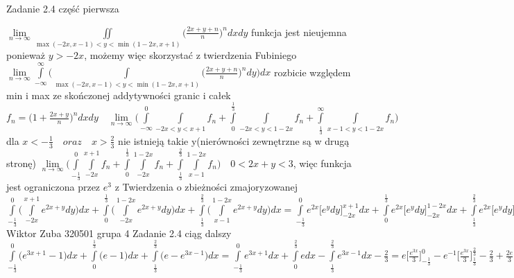 \documentclass{article}
\begin{document}
Zadanie 2.4 część pierwsza
\newline




$
\lim\limits_{n \to \infty}\iint\limits_{\max{(-2x,x-1)}<y<\min{(1-2x,x+1)}}\bigl(\frac{2x+y+n}{n}\bigr)^n dxdy
$
funkcja jest nieujemna ponieważ $y>-2x$, możemy więc skorzystać z twierdzenia Fubiniego
\newline
$
\lim\limits_{n \to \infty}\int\limits_{-\infty}^{\infty}\bigl(\int\limits_{\max{(-2x,x-1)}<y<\min{(1-2x,x+1)}}\bigl(\frac{2x+y+n}{n}\bigr)^n dy\bigr)dx
$
rozbicie względem min i max ze skończonej addytywności granic i całek
$
f_{n}=\bigl(1+\frac{2x+y}{n}\bigr)^n dxdy \quad
\lim\limits_{n \to \infty}\bigl(\int\limits_{-\infty}^{0}\int\limits_{-2x<y<x+1}f_{n}+\int\limits_{0}^{\frac{1}{3}}\int\limits_{-2x<y<1-2x}f_{n}
+\int\limits_{\frac{1}{3}}^{\infty}\int\limits_{x-1<y<1-2x}f_{n}\bigr)
$dla $x<-\frac{1}{3} \quad oraz \quad x>\frac{2}{3}$ nie istnieją takie y(nierówności zewnętrzne są w drugą stronę)
$
\lim\limits_{n \to \infty}\bigl(\int\limits_{-\frac{1}{3}}^{0}\int\limits_{-2x}^{x+1}f_{n}+\int\limits_{0}^{\frac{1}{3}}\int\limits_{-2x}^{1-2x}f_{n}
+\int\limits_{\frac{1}{3}}^{\frac{2}{3}}\int\limits_{x-1}^{1-2x}f_{n}\bigr)\quad
0<2x+y<3$, więc funkcja jest ograniczona przez $e^3$ z Twierdzenia o zbieżności zmajoryzowanej
$
\int\limits_{-\frac{1}{3}}^{0}\bigl(\int\limits_{-2x}^{x+1}e^{2x+y}dy\bigl)dx
+\int\limits_{0}^{\frac{1}{3}}\bigl(\int\limits_{-2x}^{1-2x}e^{2x+y}dy\bigr)dx
+\int\limits_{\frac{1}{3}}^{\frac{2}{3}}\bigl(\int\limits_{x-1}^{1-2x}e^{2x+y}dy\bigr)dx
=
\int\limits_{-\frac{1}{3}}^{0}e^{2x}\bigl[e^ydy\bigl]_{-2x}^{x+1}dx
+\int\limits_{0}^{\frac{1}{3}}e^{2x}\bigl[e^ydy\bigl]_{-2x}^{1-2x}dx
+\int\limits_{\frac{1}{3}}^{\frac{2}{3}}e^{2x}\bigl[e^ydy\bigl]_{x-1}^{1-2x}dx
=$
\newpage
Wiktor Zuba 320501 grupa 4
\newline
Zadanie 2.4 ciąg dalszy
\newline
$
\int\limits_{-\frac{1}{3}}^{0}\bigl(e^{3x+1}-1\bigr)dx
+\int\limits_{0}^{\frac{1}{3}}\bigl(e-1\bigr)dx
+\int\limits_{\frac{1}{3}}^{\frac{2}{3}}\bigl(e-e^{3x-1}\bigr)dx
=
\int\limits_{-\frac{1}{3}}^{0}e^{3x+1}dx+\int\limits_{0}^{\frac{2}{3}}edx-\int\limits_{\frac{1}{3}}^{\frac{2}{3}}e^{3x-1}dx-\frac{2}{3}
=
e\bigl[\frac{e^{3x}}{3}\bigr]_{-\frac{1}{3}}^{0}-e^{-1}\bigl[\frac{e^{3x}}{3}\bigr]_{\frac{1}{3}}^{\frac{2}{3}}-\frac{2}{3}+\frac{2e}{3}
=
\frac{e}{3}-\frac{1}{3}-\frac{e}{3}+\frac{1}{3}-\frac{2}{3}+\frac{2e}{3}
=
\frac{2}{3}(e-1)
$
\newline
\end{document}
